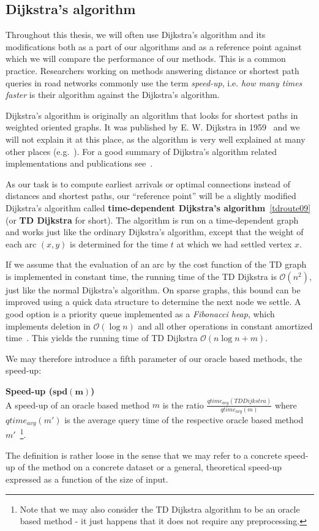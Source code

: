 \subsection{Dijkstra's algorithm} 
\label{subsec:dijkstra}
	
	\noindent Throughout this thesis, we will often use Dijkstra's algorithm and its modifications both as a part of our algorithms and as a reference point against which we will compare the performance of our methods. This is a common practice. Researchers working on methods answering distance or shortest path queries in road networks commonly use the term \textit{speed-up}, i.e. \textit{how many times faster} is their algorithm against the Dijkstra's algorithm.
	
	Dijkstra's algorithm is originally an algorithm that looks for shortest paths in weighted oriented graphs. It was published by E. W. Dijkstra in 1959~\cite{dijkstra59} and we will not explain it at this place, as the algorithm is very well explained at many other places (e.g.~\cite{dijkstraexp}). For a good summary of Dijkstra's algorithm related implementations and publications see~\cite{sommerthesis10}.
	
	As our task is to compute earliest arrivals or optimal connections instead of distances and shortest paths, our ``reference point'' will be a slightly modified Dijkstra's algorithm called \textbf{time-dependent Dijkstra's algorithm}~\ref{tdroute09} (or \textbf{TD Dijkstra} for short). The algorithm is run on a time-dependent graph and works just like the ordinary Dijkstra's algorithm, except that the weight of each arc $(x, y)$ is determined for the time $t$ at which we had settled vertex $x$.
	
	If we assume that the evaluation of an arc by the cost function of the TD graph is implemented in constant time, the running time of the TD Dijkstra is $\mathcal{O}(n^{2})$, just like the normal Dijkstra's algorithm. On sparse graphs, this bound can be improved using a quick data structure to determine the next node we settle. A good option is a priority queue implemented as a \textit{Fibonacci heap}, which implements deletion in $\mathcal{O}(\log n)$ and all other operations in constant amortized time~\cite{sommerthesis10}. This yields the running time of TD Dijkstra $\mathcal{O}(n \log n + m)$.
	
	We may therefore introduce a fifth parameter of our oracle based methods, the speed-up:
	
	\begin{definition}
		\textbf{Speed-up ($\bm{spd(m)}$)}\\
        A speed-up of an oracle based method $m$ is the ratio $\frac{\displaystyle qtime_{avg}(TD Dijkstra)}{\displaystyle qtime_{avg}(m)}$ where $qtime_{avg}(m')$ is the average query time of the respective oracle based method $m'$~\footnote{Note that we may also consider the TD Dijkstra algorithm to be an oracle based method - it just happens that it does not require any preprocessing.}.
	\end{definition}
	
	\noindent The definition is rather loose in the sense that we may refer to a concrete speed-up of the method on a concrete dataset or a general, theoretical speed-up expressed as a function of the size of input.